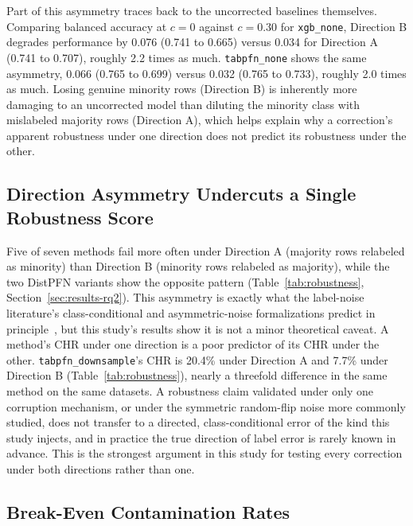 Part of this asymmetry traces back to the uncorrected baselines themselves.
Comparing balanced accuracy at $c{=}0$ against $c{=}0.30$ for
\texttt{xgb\_none}, Direction B degrades performance by 0.076 (0.741 to
0.665) versus 0.034 for Direction A (0.741 to 0.707), roughly 2.2 times as
much. \texttt{tabpfn\_none} shows the same asymmetry, 0.066 (0.765 to 0.699)
versus 0.032 (0.765 to 0.733), roughly 2.0 times as much.
Losing genuine minority rows (Direction B) is inherently more damaging to
an uncorrected model than diluting the minority class with mislabeled
majority rows (Direction A), which helps explain why a correction's
apparent robustness under one direction does not predict its robustness
under the other.

\subsection{Direction Asymmetry Undercuts a Single Robustness Score}
\label{sec:discussion-direction}

Five of seven methods fail more often under Direction A (majority rows
relabeled as minority) than Direction B (minority rows relabeled as
majority), while the two DistPFN variants show the opposite pattern
(Table~\ref{tab:robustness}, Section~\ref{sec:results-rq2}). This
asymmetry is exactly what the label-noise literature's class-conditional
and asymmetric-noise formalizations
predict in principle~\cite{natarajan2013noisylabels,scott2013asymmetricnoise},
but this study's results show it is not a minor theoretical caveat. A
method's CHR under one direction is a poor predictor of its CHR under the
other. \texttt{tabpfn\_downsample}'s CHR is 20.4\% under Direction A and
7.7\% under Direction B (Table~\ref{tab:robustness}), nearly a threefold difference in the same method
on the same datasets. A robustness claim validated under only one
corruption mechanism, or under the symmetric random-flip noise more
commonly studied, does not transfer to a directed, class-conditional error
of the kind this study injects, and in practice the true direction of
label error is rarely known in advance. This is the strongest argument in
this study for testing every correction under both directions rather than
one.

\subsection{Break-Even Contamination Rates}
\label{sec:results-rq3}

